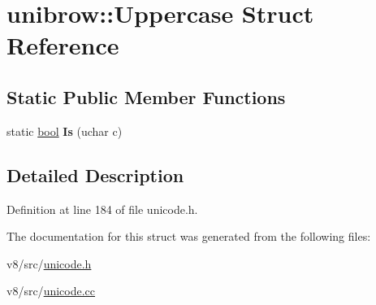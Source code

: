 \hypertarget{structunibrow_1_1Uppercase}{}\section{unibrow\+:\+:Uppercase Struct Reference}
\label{structunibrow_1_1Uppercase}
\subsection*{Static Public Member Functions}
\begin{DoxyCompactItemize}
\item 
\mbox{\label{structunibrow_1_1Uppercase_aa37be30817948f9926a099bc60a45973}} 
static \mbox{\hyperlink{classbool}{bool}} {\bfseries Is} (uchar c)
\end{DoxyCompactItemize}


\subsection{Detailed Description}


Definition at line 184 of file unicode.\+h.



The documentation for this struct was generated from the following files\+:\begin{DoxyCompactItemize}
\item 
v8/src/\mbox{\hyperlink{unicode_8h}{unicode.\+h}}\item 
v8/src/\mbox{\hyperlink{unicode_8cc}{unicode.\+cc}}\end{DoxyCompactItemize}
